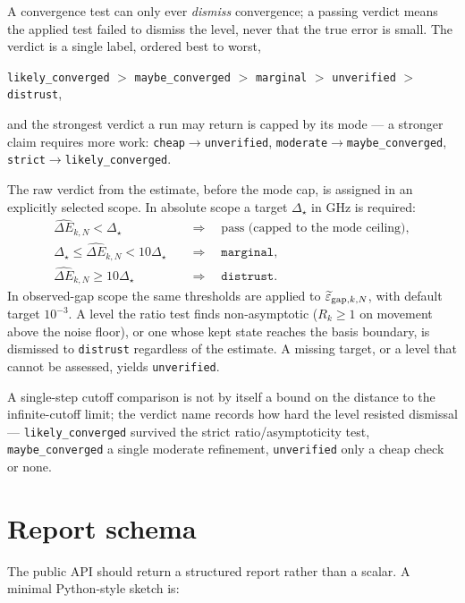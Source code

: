 \documentclass[11pt,a4paper]{article}
\newcommand{\eps}{\varepsilon}
\newcommand{\errhat}{\widehat{\Delta E}}
\begin{document}
A convergence test can only ever \emph{dismiss} convergence; a passing verdict
means the applied test failed to dismiss the level, never that the true error is
small.  The verdict is a single label, ordered best to worst,
\begin{center}
\small\texttt{likely\_converged} $>$ \texttt{maybe\_converged} $>$
\texttt{marginal} $>$ \texttt{unverified} $>$ \texttt{distrust},
\end{center}
and the strongest verdict a run may return is capped by its mode --- a stronger
claim requires more work: \texttt{cheap}$\to$\texttt{unverified},
\texttt{moderate}$\to$\texttt{maybe\_converged},
\texttt{strict}$\to$\texttt{likely\_converged}.

The raw verdict from the estimate, before the mode cap, is assigned in an
explicitly selected scope.  In absolute scope a target \(\Delta_\star\) in GHz is
required:
\begin{align}
\errhat_{k,N}<\Delta_\star &\quad\Rightarrow\quad \text{pass (capped to the mode ceiling)},\\
\Delta_\star\le \errhat_{k,N}<10\Delta_\star &\quad\Rightarrow\quad \texttt{marginal},\\
\errhat_{k,N}\ge 10\Delta_\star &\quad\Rightarrow\quad \texttt{distrust}.
\end{align}
In observed-gap scope the same thresholds are applied to
\(\widetilde\eps_{{\rm gap},k,N}\), with default target \(10^{-3}\).  A level the
ratio test finds non-asymptotic (\(R_k\ge 1\) on movement above the noise floor),
or one whose kept state reaches the basis boundary, is dismissed to
\texttt{distrust} regardless of the estimate.  A missing target, or a level that
cannot be assessed, yields \texttt{unverified}.

A single-step cutoff comparison is not by itself a bound on the distance to the
infinite-cutoff limit; the verdict name records how hard the level resisted
dismissal --- \texttt{likely\_converged} survived the strict ratio/asymptoticity
test, \texttt{maybe\_converged} a single moderate refinement, \texttt{unverified}
only a cheap check or none.

\section{Report schema}

The public API should return a structured report rather than a scalar.  A minimal Python-style sketch is:
\end{document}
